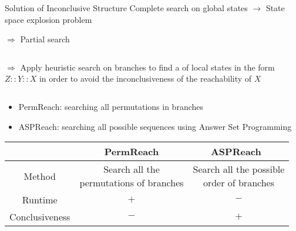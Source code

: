 \begin{frame}{Solution of Inconclusive Structure}
    Complete search on global states \pause $\to$ State space explosion problem {\large \frownie{}} \pause
    
    \vspace{0.2cm}
    $\Longrightarrow$ Partial search
    
    \vspace{0.5cm}
    \pause     
\begin{columns}
\begin{column}{0.5\textwidth}
$\Longrightarrow$ Apply heuristic search on branches to find a  of local states in the form $Z::Y::X$ in order to avoid the inconclusiveness of the reachability of $X$
\end{column}
\begin{column}{0.5\textwidth}
\centering

\end{column}
\end{columns}

\vspace{0.5cm}
\pause     
\begin{itemize}
    \item PermReach: searching all permutations in branches
    \pause
    \item ASPReach: searching all possible sequences using Answer Set Programming~\cite{baral2003knowledge}
\end{itemize}

\pause
\centering
    \begin{tabular}{c|c|c}
        &PermReach & ASPReach~\cite{chai2018reach} \\
        \hline
        Method &\makecell{Search all the \\permutations of branches}   &\makecell{Search all the possible\\ order of branches}\\
        \hline
        Runtime & $+$ & $-$ \\
        Conclusiveness& $-$&$+$
    \end{tabular}
    
\end{frame}